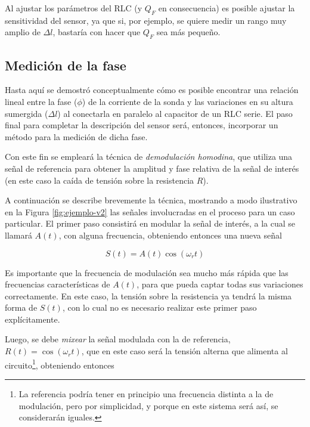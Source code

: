 Al ajustar los parámetros del RLC (y $Q_F$ en consecuencia) es posible ajustar la sensitividad del sensor, ya que si, por ejemplo, se quiere medir un rango muy amplio de $\Delta l$, bastaría con hacer que $Q_{F}$ sea más pequeño. %







\subsection{Medición de la fase} 
Hasta aquí se demostró conceptualmente cómo es posible encontrar una relación lineal entre la fase ($\phi$) de la corriente de la sonda y las variaciones en su altura sumergida ($\Delta l$) al conectarla en paralelo al capacitor de  un RLC serie. El paso final para completar la descripción del sensor será, entonces, incorporar un método para la medición de dicha fase. %

Con este fin se empleará la técnica de \textit{demodulación homodina}, que utiliza una señal de referencia para obtener la amplitud y fase relativa de la señal de interés (en este caso la caída de tensión sobre la resistencia $R$). %

A continuación se describe brevemente la técnica, mostrando  a modo ilustrativo en la Figura \ref{fig:ejemplo-v2} las señales involucradas en el proceso para un caso particular. El primer paso consistirá en modular la señal de interés, a la cual se llamará $A(t)$, con alguna frecuencia, obteniendo entonces una nueva señal %

\begin{equation}
	S(t) = A(t)\cos(\omega_r t)
\end{equation} 

Es importante que la frecuencia de modulación sea mucho más rápida que las frecuencias características de $A(t)$, para que pueda captar todas sus variaciones correctamente. En este caso, la tensión sobre la resistencia ya tendrá la misma forma de $S(t)$, con lo cual no es necesario realizar este primer paso explícitamente. %

Luego, se debe \textit{mixear} la señal  modulada con la de referencia, $R(t)=\cos(\omega_r t)$, que en este caso será la tensión alterna que alimenta al circuito\footnote{\normalsize La referencia podría tener en principio una frecuencia distinta a la de modulación, pero por simplicidad, y porque en este sistema será así, se considerarán iguales.},  obteniendo entonces 

